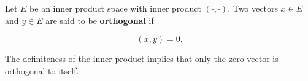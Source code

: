 Let $E$ be an inner product space with inner product $(\cdot, \cdot)$. Two vectors $x \in E$ and $y \in E$ are said to be \textbf{orthogonal} if

$$(x, y) = 0.$$

The definiteness of the inner product implies that only the zero-vector is orthogonal to itself.
